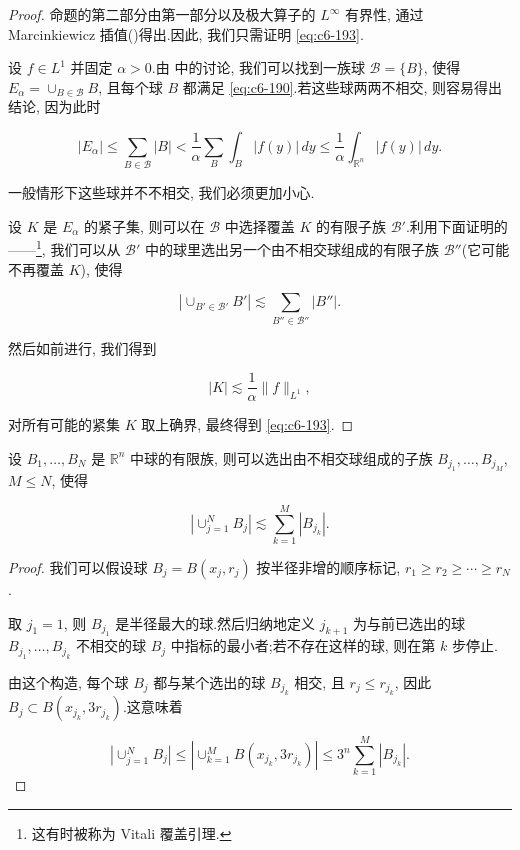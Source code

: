 \begin{proof}
命题的第二部分由第一部分以及极大算子的 $L^\infty$ 有界性, 通过 Marcinkiewicz 插值()得出.因此, 我们只需证明 \eqref{eq:c6-193}.

设 $f\in L^1$ 并固定 $\alpha>0$.由 中的讨论, 我们可以找到一族球 $\mathcal{B} = \{B\}$, 使得 $E_\alpha = \cup_{B\in\mathcal{B}}B$, 且每个球 $B$ 都满足 \eqref{eq:c6-190}.若这些球两两不相交, 则容易得出结论, 因为此时

\[
|E_\alpha| \le \sum_{B\in\mathcal{B}}|B| < \frac{1}{\alpha}\sum_B\int_B |f(y)|\, dy \le \frac{1}{\alpha}\int_{\mathbb{R}^n}|f(y)|\, dy.
\]

一般情形下这些球并不不相交, 我们必须更加小心.

设 $K$ 是 $E_\alpha$ 的紧子集, 则可以在 $\mathcal{B}$ 中选择覆盖 $K$ 的有限子族 $\mathcal{B}'$.利用下面证明的——\footnote{这有时被称为 Vitali 覆盖引理.}, 我们可以从 $\mathcal{B}'$ 中的球里选出另一个由不相交球组成的有限子族 $\mathcal{B}''$(它可能不再覆盖 $K$), 使得

\[
|\cup_{B'\in\mathcal{B}'}B'| \lesssim \sum_{B''\in\mathcal{B}''}|B''|.
\]

然后如前进行, 我们得到

\[
|K| \lesssim \frac{1}{\alpha}\|f\|_{L^1},
\]

对所有可能的紧集 $K$ 取上确界, 最终得到 \eqref{eq:c6-193}.
\end{proof}

\begin{lemma}\label{lem:c6-2.5}
设 $B_1, \ldots, B_N$ 是 $\mathbb{R}^n$ 中球的有限族, 则可以选出由不相交球组成的子族 $B_{j_1}, \ldots, B_{j_M}$, $M\le N$, 使得

\[
\left|\cup_{j=1}^N B_j\right| \lesssim \sum_{k=1}^M |B_{j_k}|.
\]
\end{lemma}

\begin{proof}
我们可以假设球 $B_j = B(x_j, r_j)$ 按半径非增的顺序标记, $r_1\ge r_2\ge\cdots\ge r_N$.

取 $j_1 = 1$, 则 $B_{j_1}$ 是半径最大的球.然后归纳地定义 $j_{k+1}$ 为与前已选出的球 $B_{j_1}, \ldots, B_{j_k}$ 不相交的球 $B_j$ 中指标的最小者;若不存在这样的球, 则在第 $k$ 步停止.

由这个构造, 每个球 $B_j$ 都与某个选出的球 $B_{j_k}$ 相交, 且 $r_j\le r_{j_k}$, 因此 $B_j\subset B(x_{j_k}, 3r_{j_k})$.这意味着

\[
\left|\cup_{j=1}^N B_j\right| \le \left|\cup_{k=1}^M B(x_{j_k}, 3r_{j_k})\right| \le 3^n\sum_{k=1}^M |B_{j_k}|.
\]
\end{proof}

